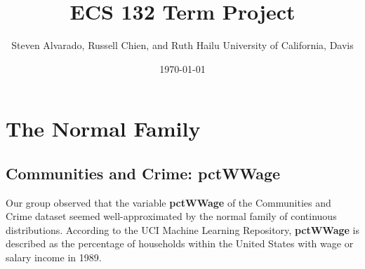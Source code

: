 \documentclass[12pt, letterpaper]{report}
\title{\textbf{ECS 132 Term Project}}
\author{\parbox{\linewidth}{\centering%
  Steven Alvarado, Russell Chien, and Ruth Hailu\endgraf\bigskip
  University of California, Davis}}
\date{\monthyeardate\today}
\begin{document}
\maketitle
\chapter{The Normal Family}
\section{Communities and Crime: pctWWage}

Our group observed that the variable \textbf{pctWWage} of the Communities and Crime dataset seemed well-approximated by the normal family of continuous distributions.
According to the UCI Machine Learning Repository, \textbf{pctWWage} is described as the percentage of households within the United States with wage or salary income in 1989.
\end{document}
